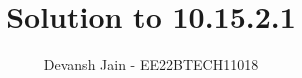 \documentclass[journal,12pt,onecolumn]{IEEEtran}
\theoremstyle{remark}
\begin{document}
%




\vspace{3cm}

\title{Solution to 10.15.2.1}
\author{Devansh Jain - EE22BTECH11018}


%
%
%

% 
%



% 
\end{document}
